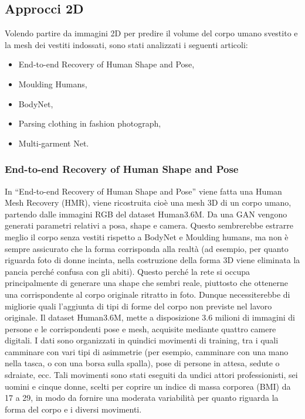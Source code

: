 \medskip

\subsection{Approcci 2D}

Volendo partire da immagini 2D per predire il volume del corpo umano svestito e la mesh dei vestiti indossati, sono stati analizzati i seguenti articoli:

\begin{itemize}
\item End-to-end Recovery of Human Shape and Pose,
\item Moulding Humans,
\item BodyNet,
\item Parsing clothing in fashion photograph,
\item Multi-garment Net.

\end{itemize}


\subsubsection{End-to-end Recovery of Human Shape and Pose}

In “End-to-end Recovery of Human Shape and Pose” \cite{kanazawa2018end} viene fatta una Human Mesh Recovery (HMR), viene ricostruita cioè una mesh 3D di un corpo umano, partendo dalle immagini RGB del dataset Human3.6M.
Da una GAN vengono generati parametri relativi a posa, shape e camera.
Questo sembrerebbe estrarre meglio il corpo senza vestiti rispetto a BodyNet e Moulding humans, ma non è sempre assicurato che la forma corrisponda alla realtà (ad esempio, per quanto riguarda foto di donne incinta, nella costruzione della forma 3D viene eliminata la pancia perché confusa con gli abiti). Questo perché la rete si occupa principalmente di generare una shape che sembri reale, piuttosto che ottenerne una corrispondente al corpo originale ritratto in foto.
Dunque necessiterebbe di migliorie quali l’aggiunta di tipi di forme del corpo non previste nel lavoro originale.
Il dataset Human3.6M, mette a disposizione 3.6 milioni di immagini di persone e le corrispondenti pose e mesh, acquisite mediante quattro camere digitali. I dati sono organizzati in quindici movimenti di training, tra i quali camminare con vari tipi di asimmetrie (per esempio, camminare con una mano nella tasca, o con una borsa sulla spalla), pose di persone in attesa, sedute o sdraiate, ecc. Tali movimenti sono stati eseguiti da undici attori professionisti, sei uomini e cinque donne, scelti per coprire un indice di massa corporea (BMI) da 17 a 29, in modo da fornire una moderata variabilità per quanto riguarda la forma del corpo e i diversi movimenti.

